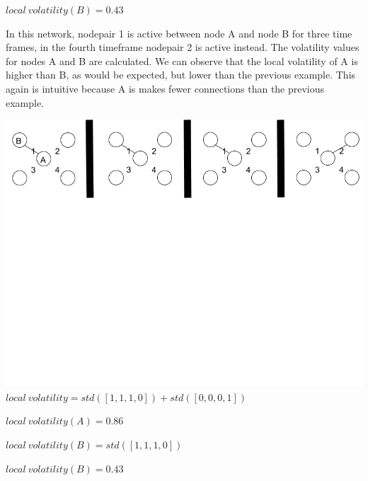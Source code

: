 \documentclass[oneside,12pt]{Classes/RoboticsLaTeX}
\begin{document}
\begin{appendices}
\begin{center}
$local\ volatility(B) = 0.43$
\end{center}

In this network, nodepair 1 is active between node A and node B for three time frames, in the fourth timeframe nodepair 2 is active instead. The volatility values for nodes A and B are calculated. We can observe that the local volatility of A is higher than B, as would be expected, but lower than the previous example. This again is intuitive because A is makes fewer connections than the previous example.
\begin{center}
\includegraphics[trim={0 15cm 0 0}, width=140mm]{./Figures/volatilityAppendix2.png}
$local\ volatility = std([1,1,1,0]) + std([0,0,0,1])$

$local\ volatility(A) = 0.86$

$local\ volatility(B) = std([1,1,1,0])$

$local\ volatility(B) = 0.43$
\end{center}


\end{appendices}
\end{document}
